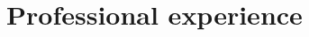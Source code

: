 \documentclass[11pt,a4paper,]{awesome-cv}
\begin{document}
\makecvheader







\hypertarget{professional-experience}{%
\section{Professional experience}\label{professional-experience}}
\end{document}
